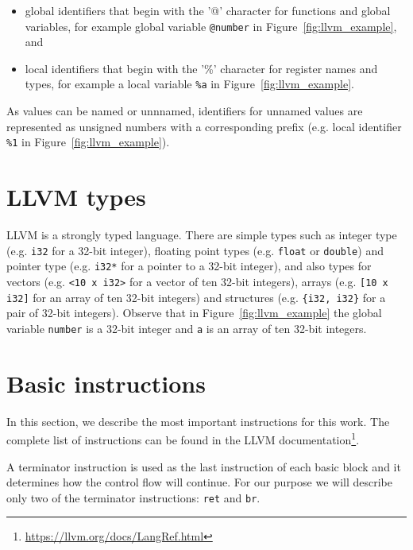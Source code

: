 \begin{itemize}
    \item global identifiers that begin with the '@' character for functions
    and global variables, for example global variable \texttt{@number} in
    Figure~\ref{fig:llvm_example}, and
    \item local identifiers that begin with the '\%' character for register
    names and types, for example a local variable \texttt{\%a} in
    Figure~\ref{fig:llvm_example}.
\end{itemize}

As values can be named or unnnamed, identifiers for unnamed values are
represented as unsigned numbers with a corresponding prefix (e.g. local
identifier \texttt{\%1} in Figure~\ref{fig:llvm_example}).

\section{LLVM types}

LLVM is a strongly typed language. There are simple types such as integer type
(e.g. \texttt{i32} for a 32-bit integer), floating point types (e.g.
\texttt{float} or \texttt{double}) and pointer type (e.g. \texttt{i32*} for a
pointer to a 32-bit integer), and also types for vectors (e.g. \texttt{<10 x
i32>} for a vector of ten 32-bit integers), arrays (e.g. \texttt{[10 x i32]}
for an array of ten 32-bit integers) and structures (e.g. \texttt{\{i32, i32\}}
for a pair of 32-bit integers). Observe that in Figure~\ref{fig:llvm_example}
the global variable \texttt{number} is a 32-bit integer and
\texttt{a} is an array of ten 32-bit integers.

\section{Basic instructions}

In this section, we describe the most important instructions for this work. The
complete list of instructions can be found in the LLVM
documentation\footnote{\url{https://llvm.org/docs/LangRef.html}}.

A terminator instruction is used as the last instruction of each basic block
and it determines how the control flow will continue. For our purpose we will
describe only two of the terminator instructions: \texttt{ret} and \texttt{br}.

